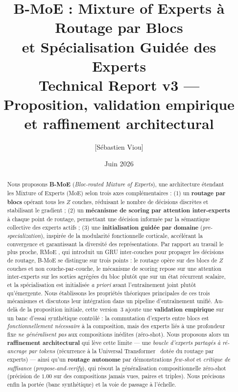 \documentclass[10pt,a4paper]{article}
\title{\textbf{B-MoE : Mixture of Experts à Routage par Blocs\\
et Spécialisation Guidée des Experts}\\[0.5em]
\large Technical Report v3 — Proposition, validation empirique et raffinement architectural}
\author{[Sébastien Viou]}
\date{Juin 2026}
\begin{document}
\maketitle

\begin{abstract}
Nous proposons \textbf{B-MoE} (\textit{Bloc-routed Mixture of Experts}), une architecture étendant les Mixture of Experts (MoE) selon trois axes complémentaires : (1) un \textbf{routage par blocs} opérant tous les $Z$ couches, réduisant le nombre de décisions discrètes et stabilisant le gradient ; (2) un \textbf{mécanisme de scoring par attention inter-experts} à chaque point de routage, permettant une décision informée par la sémantique collective des experts actifs ; (3) une \textbf{initialisation guidée par domaine} (\textit{pre-specialization}), inspirée de la modularité fonctionnelle corticale, accélérant la convergence et garantissant la diversité des représentations. Par rapport au travail le plus proche, RMoE \cite{qiu2025rmoe}, qui introduit un GRU inter-couches pour propager les décisions de routage, B-MoE se distingue sur trois points : le routage opère sur des blocs de $Z$ couches et non couche-par-couche, le mécanisme de scoring repose sur une attention inter-experts sur les sorties agrégées du bloc plutôt que sur un état récurrent scalaire, et la spécialisation est initialisée \textit{a priori} avant l'entraînement joint plutôt qu'émergente. Nous établissons les propriétés théoriques principales de ces trois mécanismes et discutons leur intégration dans un pipeline d'entraînement unifié. Au-delà de la proposition initiale, cette version~3 ajoute une \textbf{validation empirique} sur un banc d'essai synthétique contrôlé : la commutation d'experts entre blocs est \emph{fonctionnellement nécessaire} à la composition, mais des experts liés à une profondeur fixe \emph{ne généralisent pas} aux compositions inédites (zéro-shot). Nous proposons alors un \textbf{raffinement architectural} qui lève cette limite --- une \emph{boucle d'experts partagés à ré-ancrage par tokens} (récurrence à la Universal Transformer~\cite{dehghani2019universal} dotée du routage par experts) --- ainsi qu'un \textbf{routage autonome} par démonstrations \emph{few-shot} et \emph{critique de suffisance} (\textit{propose-and-verify}), qui résout la généralisation compositionnelle zéro-shot (précision de $1.00$ sur des compositions jamais vues, paires et triples). Nous précisons enfin la portée (banc synthétique) et la voie de passage à l'échelle.
\end{abstract}
\end{document}
